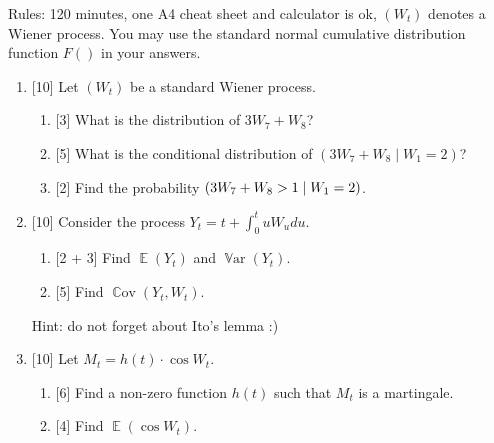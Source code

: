 \documentclass[12pt]{article}
\DeclareMathOperator{\Cov}{\mathbb{C}ov}
\DeclareMathOperator{\Var}{\mathbb{V}ar}
\let\P\relax
\DeclareMathOperator{\P}{\mathbb{P}}
\DeclareMathOperator{\E}{\mathbb{E}}
\begin{document}
Rules: 120 minutes, one A4 cheat sheet and calculator is ok, $(W_t)$ denotes a Wiener process.
You may use the standard normal cumulative distribution function $F()$ in your answers.

\begin{enumerate}
    \item {[10]} Let $(W_t)$ be a standard Wiener process. 
    \begin{enumerate}
        \item {[3]} What is the distribution of $3W_7 + W_8$? 
        \item {[5]} What is the conditional distribution of $(3W_7 + W_8 \mid W_1 = 2)$?
        \item {[2]} Find the probability $\P(3W_7 + W_8 > 1 \mid W_1 = 2)$.
    \end{enumerate}




    \item {[10]} Consider the process $Y_t = t + \int_0^t u W_u  du$.
     \begin{enumerate}
         \item {[2 + 3]} Find $\E(Y_t)$ and $\Var(Y_t)$.
         \item {[5]} Find $\Cov(Y_t, W_t)$.
    \end{enumerate}

    Hint: do not forget about Ito's lemma :)


    \item {[10]} Let $M_t = h(t) \cdot \cos W_t$.
    \begin{enumerate}
        \item {[6]} Find a non-zero function $h(t)$ such that $M_t$ is a martingale.
        \item {[4]} Find $\E(\cos W_t)$.
    \end{enumerate}
    


\end{enumerate}
\end{document}
